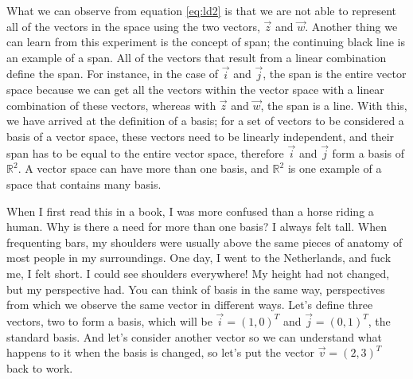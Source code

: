 \documentclass[a4,12pt,twosided,openany]{memoir}
\begin{document}
What we can observe from equation \ref{eq:ld2} is that we are not able to represent all of the vectors in the space using the two vectors, $\overrightarrow{z}$ and $\overrightarrow{w}$. Another thing we can learn from this experiment is the concept of span; the continuing black line is an example of a span. All of the vectors that result from a linear combination define the span. For instance, in the case of $\overrightarrow{i}$ and $\overrightarrow{j}$, the span is the entire vector space because we can get all the vectors within the vector space with a linear combination of these vectors, whereas with $\overrightarrow{z}$ and $\overrightarrow{w}$, the span is a line. With this, we have arrived at the definition of a basis; for a set of vectors to be considered a basis of a vector space, these vectors need to be linearly independent, and their span has to be equal to the entire vector space, therefore $\overrightarrow{i}$ and $\overrightarrow{j}$ form a basis of $\mathbb{R}^2$. A vector space can have more than one basis, and $\mathbb{R}^2$ is one example of a space that contains many basis. 
\par 
\indent
When I first read this in a book, I was more confused than a horse riding a human. Why is there a need for more than one basis? I always felt tall. When frequenting bars, my shoulders were usually above the same pieces of anatomy of most people in my surroundings. One day, I went to the Netherlands, and fuck me, I felt short. I could see shoulders everywhere! My height had not changed, but my perspective had. You can think of basis in the same way, perspectives from which we observe the same vector in different ways. Let’s define three vectors, two to form a basis, which will be $\overrightarrow{i} = (1,0)^T$ and $\overrightarrow{j} =(0,1)^T$, the standard basis. And let’s consider another vector so we can understand what happens to it when the basis is changed, so let’s put the vector $\overrightarrow{v} = (2,3)^T$ back to work.
\end{document}
